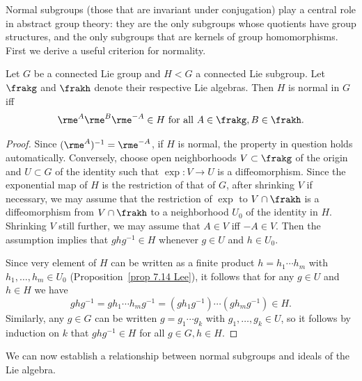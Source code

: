Normal subgroups (those that are invariant under conjugation) play a central role in abstract group theory: they are the only subgroups whose quotients have group structures, and the only subgroups that are kernels of group homomorphisms. First we derive a useful criterion for normality.

\begin{lem}\label{lem 20.23 Lee}
    Let $G$ be a connected Lie group and $H<G$ a connected Lie subgroup. Let $\frakg$ and $\frakh$ denote their respective Lie algebras. Then $H$ is normal in $G$ iff
    \[\rme^A \rme^B \rme^{-A}\in H \text{ for all }A\in \frakg,B\in\frakh.\]
\end{lem}
\begin{proof}
    Since $(\rme^A)^{-1}=\rme^{-A}$, if $H$ is normal, the property in question holds automatically. Conversely, choose open neighborhoods $V\subset \frakg$ of the origin and $U\subset G$ of the identity such that $\exp:V\to U$ is a diffeomorphism. Since the exponential map of $H$ is the restriction of that of $G$, after shrinking $V$ if necessary, we may assume that the restriction of $\exp$ to $V\cap \frakh$ is a diffeomorphism from $V\cap \frakh$ to a neighborhood $U_0$ of the identity in $H$. Shrinking $V$ still further, we may assume that $A\in V$ iff $-A\in V$. Then the assumption implies that $ghg^{-1}\in H$ whenever $g\in U$ and $h\in U_0$.

    Since very element of $H$ can be written as a finite product $h=h_1\cdots h_m$ with $h_1,\ldots, h_m\in U_0$ (Proposition~\ref{prop 7.14 Lee}), it follows that for any $g\in U$ and $h\in H$ we have
    \[ghg^{-1}=gh_1\cdots h_m g^{-1}=(gh_1g^{-1})\cdots (gh_m g^{-1})\in H.\]
    Similarly, any $g\in G$ can be written $g=g_1\cdots g_k$ with $g_1,\ldots, g_k\in U$, so it follows by induction on $k$ that $ghg^{-1}\in H$ for all $g\in G,h\in H$.
\end{proof}


We can now establish a relationship between normal subgroups and ideals of the Lie algebra.

